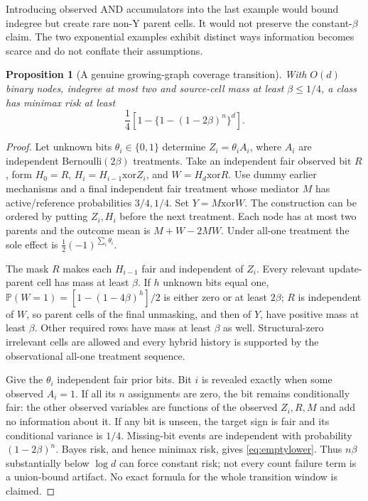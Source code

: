 \documentclass[11pt,a4paper]{article}
\numberwithin{equation}{section}
\newtheorem{proposition}[theorem]{Proposition}
\theoremstyle{definition}
\newcommand{\Prb}{\mathbb P}
\begin{document}
Introducing observed AND accumulators into the last example would bound
indegree but create rare non-Y parent cells. It would not preserve the
constant-$\beta$ claim. The two exponential examples exhibit distinct
ways information becomes scarce and do not conflate their assumptions.

\begin{proposition}[A genuine growing-graph coverage transition]\label{prop:empty}
With $O(d)$ binary nodes, indegree at most two and source-cell mass at
least $\beta\le1/4$, a class has minimax risk at least
\begin{equation}\label{eq:emptylower}
 \frac14\left[1-\{1-(1-2\beta)^n\}^d\right].
\end{equation}
\end{proposition}
\begin{proof}
Let unknown bits $\theta_i\in\{0,1\}$ determine
$Z_i=\theta_i A_i$, where $A_i$ are independent Bernoulli$(2\beta)$
treatments. Take an independent fair observed bit $R$, form
$H_0=R$, $H_i=H_{i-1}\mathbin{\mathrm{xor}} Z_i$, and
$W=H_d\mathbin{\mathrm{xor}} R$. Use dummy earlier mechanisms and a
final independent fair treatment whose mediator $M$ has active/reference
probabilities $3/4,1/4$. Set $Y=M\mathbin{\mathrm{xor}} W$.
The construction can be ordered by putting $Z_i,H_i$ before the next
treatment. Each node has at most two parents and the outcome mean is
$M+W-2MW$. Under all-one treatment the sole effect is
$\frac12(-1)^{\sum_i\theta_i}$.

The mask $R$ makes each $H_{i-1}$ fair and independent of $Z_i$.
Every relevant update-parent cell has mass at least $\beta$. If $h$
unknown bits equal one, $\Prb(W=1)=[1-(1-4\beta)^h]/2$ is either
zero or at least $2\beta$; $R$ is independent of $W$, so parent cells
of the final unmasking, and then of $Y$, have positive mass at least
$\beta$. Other required rows have mass at least $\beta$ as well.
Structural-zero irrelevant cells are allowed and every hybrid history
is supported by the observational all-one treatment sequence.

Give the $\theta_i$ independent fair prior bits. Bit $i$ is revealed
exactly when some observed $A_i=1$. If all its $n$ assignments are zero,
the bit remains conditionally fair: the other observed variables are
functions of the observed $Z_i,R,M$ and add no information about it.
If any bit is unseen, the target sign is fair and its conditional variance
is $1/4$. Missing-bit events are independent with probability
$(1-2\beta)^n$. Bayes risk, and hence minimax risk, gives
\eqref{eq:emptylower}. Thus $n\beta$ substantially below $\log d$
can force constant risk; not every count failure term is a union-bound
artifact. No exact formula for the whole transition window is claimed.
\end{proof}
\end{document}
